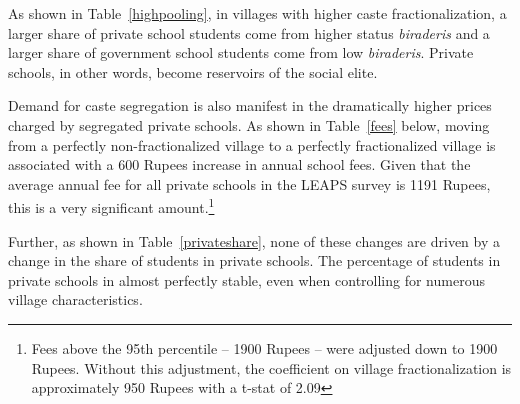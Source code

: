 \documentclass[Eubank_pk_ethnic_sorting.tex]{subfiles}
\begin{document}
As shown in Table~\ref{highpooling}, in villages with higher caste fractionalization, a larger share of private school students come from higher status \emph{biraderis} and a larger share of government school students come from low \emph{biraderis}. Private schools, in other words, become reservoirs of the social elite.




Demand for caste segregation is also manifest in the dramatically higher prices charged by segregated private schools. As shown in Table~\ref{fees} below, moving from a perfectly non-fractionalized village to a perfectly fractionalized village is associated with a 600 Rupees increase in annual school fees. Given that the average annual fee for all private schools in the LEAPS survey is 1191 Rupees, this is a very significant amount.\footnote{Fees above the 95th percentile -- 1900 Rupees -- were adjusted down to 1900 Rupees. Without this adjustment, the coefficient on village fractionalization is approximately 950 Rupees with a t-stat of 2.09}



Further, as shown in Table~\ref{privateshare}, none of these changes are driven by a change in the share of students in private schools. The percentage of students in private schools in almost perfectly stable, even when controlling for numerous village characteristics.


\end{document}
